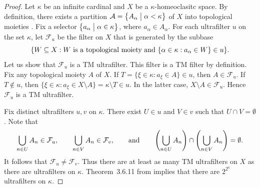 \documentclass[11pt]{amsart}
\makeatletter
\theoremstyle{definition}
\newcommand{\F}{\mathcal F}
\newcommand{\A}{\mathcal A}
\newcommand{\makeset}[2]{\left\lbrace #1 \;\middle|\;
 \begin{tabular}{@{}l@{}}
   #2
  \end{tabular}
  \right\rbrace}
\makeatother
\begin{document}
\begin{proof}

Let $\kappa$ be an infinite cardinal and $X$ be a  \(\kappa\)-homeoclasitc space.  By definition, there exists a partition \(\A=\makeset{A_\alpha}{$\alpha<\kappa$}\) of $X$ into topological moieties . 
Fix a selector \(\makeset{a_\alpha}{$\alpha \in\kappa$}\), where $a_\alpha\in A_\alpha$. 
For each ultrafilter $u$ on the set $\kappa$, let $\F_u$ be the filter on $X$ that is generated by the subbase $$\{W\subseteq X: W \hbox{ is a topological moiety and } \{\alpha\in \kappa: a_\alpha\in W\}\in u\}.$$ 
Let us show that $\F_u$ is a TM ultrafilter. This filter is a TM filter by definition. Fix any topological moiety $A$ of $X$. If $T=\{\xi\in\kappa: a_\xi\in A\}\in u$, then $A\in\F_u$. If $T\notin u$, then $\{\xi\in\kappa: a_\xi\in X\setminus A\}=\kappa\setminus T\in u$. In the latter case, $X\setminus A\in\F_u$. Hence $\F_u$ is a TM ultrafilter. 

Fix distinct ultrafilters $u,v$ on $\kappa$. There exist $U\in u$ and $V\in v$ such that $U\cap V=\emptyset$. Note that $$\bigcup_{n\in U}A_n\in \F_u, \qquad \bigcup_{n\in V}A_n\in \F_v,\qquad \hbox{and}\qquad \left(\bigcup_{n\in U}A_n \right)\cap\left(\bigcup_{n\in V}A_n\right)=\emptyset.$$ It follows that $\F_u\neq \F_v$. 
 Thus there are at least as many TM ultrafilters on \(X\) as there are ultrafilters on \(\kappa\).
Theorem~3.6.11 from \cite{Eng} implies that there are \(2^{2^\kappa}\) ultrafilters on $\kappa$.
\end{proof}
\end{document}
